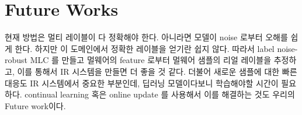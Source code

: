 \section{Future Works}

현재 방법은 멀티 레이블이 다 정확해야 한다. 아니라면 모델이 noise 로부터 오해를 쉽게 한다. 하지만 이 도메인에서 정확한 레이블을 얻기란 쉽지 않다. 따라서 label noise-robust MLC 를 만들고 멀웨어의 feature 로부터 멀웨어 샘플의 리얼 레이블을 추정하고, 이를 통해서 IR 시스템을 만들면 더 좋을 것 같다.
더불어 새로운 샘플에 대한 빠른 대응도 IR 시스템에서 중요한 부분인데, 딥러닝 모델이다보니 학습해야할 시간이 필요하다. continual learning 혹은 online update 를 사용해서 이를 해결하는 것도 우리의 Future work이다. 




